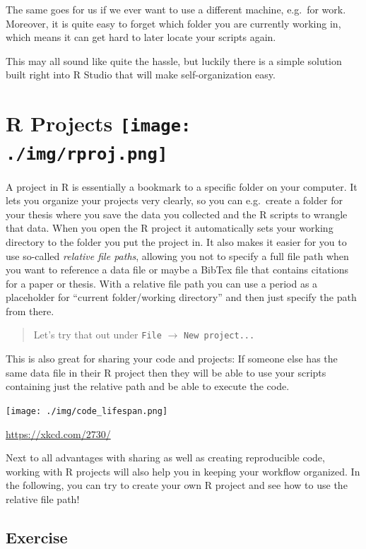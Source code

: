 \documentclass[
]{book}
\begin{document}
The same goes for us if we ever want to use a different machine, e.g.~for work.
Moreover, it is quite easy to forget which folder you are currently working in, which means it can get hard to later locate your scripts again.

This may all sound like quite the hassle, but luckily there is a simple solution built right into R Studio that will make self-organization easy.

\section[R Projects ]{\texorpdfstring{R Projects \protect\texttt{[image: ./img/rproj.png]}}{R Projects R Project}}\label{r-projects-r-project}

A project in R is essentially a bookmark to a specific folder on your computer.
It lets you organize your projects very clearly, so you can e.g.~create a folder for your thesis where you save the data you collected and the R scripts to wrangle that data.
When you open the R project it automatically sets your working directory to the folder you put the project in.
It also makes it easier for you to use so-called \emph{relative file paths}, allowing you not to specify a full file path when you want to reference a data file or maybe a BibTex file that contains citations for a paper or thesis.
With a relative file path you can use a period as a placeholder for ``current folder/working directory'' and then just specify the path from there.

\begin{quote}
Let's try that out under \texttt{File} \(\rightarrow\) \texttt{New\ project...}
\end{quote}

This is also great for sharing your code and projects:
If someone else has the same data file in their R project then they will be able to use your scripts containing just the relative path and be able to execute the code.

\texttt{[image: ./img/code\_lifespan.png]}

\url{https://xkcd.com/2730/}

Next to all advantages with sharing as well as creating reproducible code, working with R projects will also help you in keeping your workflow organized.
In the following, you can try to create your own R project and see how to use the relative file path!

\subsection*{Exercise}\label{exercise}
\end{document}
